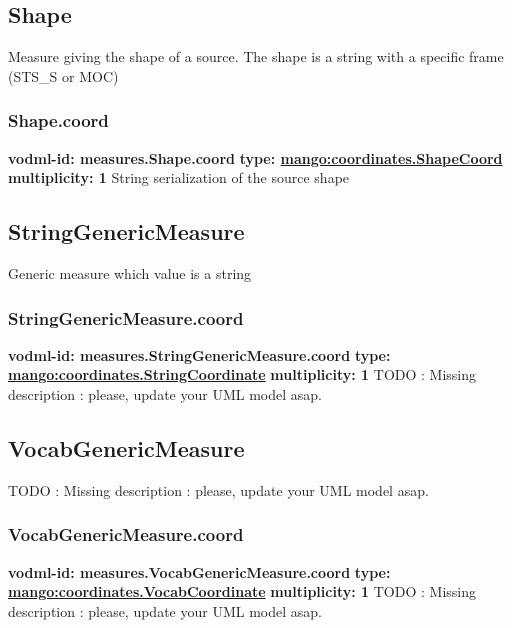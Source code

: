   \subsection{Shape}
  \label{sect:measures.Shape}
    Measure giving the shape of a source. The shape is a string with a specific frame (STS\_S or MOC)

    \subsubsection{Shape.coord}
      \textbf{vodml-id: measures.Shape.coord} \newline
      \textbf{type: \hyperref[sect:coordinates.ShapeCoord]{mango:coordinates.ShapeCoord}} \newline
      \textbf{multiplicity: 1} \newline 
      String serialization of the source shape

  \subsection{StringGenericMeasure}
  \label{sect:measures.StringGenericMeasure}
    Generic measure which value is a string

    \subsubsection{StringGenericMeasure.coord}
      \textbf{vodml-id: measures.StringGenericMeasure.coord} \newline
      \textbf{type: \hyperref[sect:coordinates.StringCoordinate]{mango:coordinates.StringCoordinate}} \newline
      \textbf{multiplicity: 1} \newline 
      TODO : Missing description : please, update your UML model asap.

  \subsection{VocabGenericMeasure}
  \label{sect:measures.VocabGenericMeasure}
    TODO : Missing description : please, update your UML model asap.

    \subsubsection{VocabGenericMeasure.coord}
      \textbf{vodml-id: measures.VocabGenericMeasure.coord} \newline
      \textbf{type: \hyperref[sect:coordinates.VocabCoordinate]{mango:coordinates.VocabCoordinate}} \newline
      \textbf{multiplicity: 1} \newline 
      TODO : Missing description : please, update your UML model asap.

